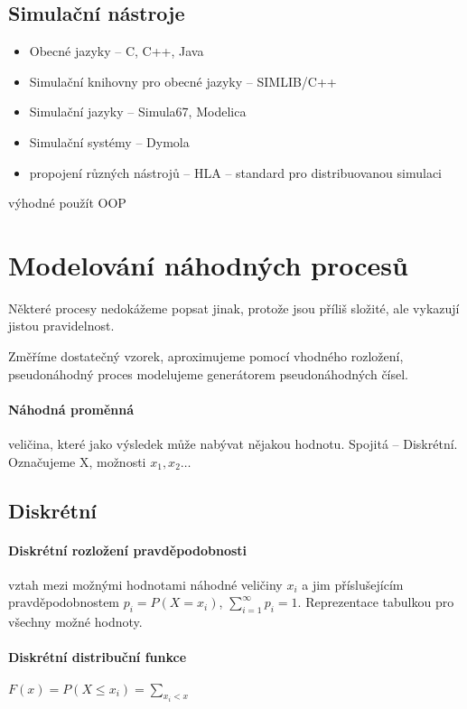 \documentclass[a4paper, 11pt]{report}
\begin{document}
\subsection{Simulační nástroje}
\begin{itemize}
	\item Obecné jazyky -- C, C++, Java
	\item Simulační knihovny pro obecné jazyky -- SIMLIB/C++
	\item Simulační jazyky -- Simula67, Modelica
	\item Simulační systémy -- Dymola
	\item propojení různých nástrojů -- HLA -- standard pro distribuovanou simulaci
\end{itemize}
výhodné použít OOP

\section{Modelování náhodných procesů}

Některé procesy nedokážeme popsat jinak, protože jsou příliš složité, ale vykazují jistou pravidelnost.

Změříme dostatečný vzorek, aproximujeme pomocí vhodného rozložení, pseudonáhodný proces modelujeme generátorem pseudonáhodných čísel.

\paragraph{Náhodná proměnná}
veličina, které jako výsledek může nabývat nějakou hodnotu. Spojitá -- Diskrétní. Označujeme X, možnosti $x_1, x_2 \dots$

\subsection{Diskrétní}

\paragraph{Diskrétní rozložení pravděpodobnosti}
vztah mezi možnými hodnotami náhodné veličiny $x_i$ a jim příslušejícím pravděpodobnostem $p_i = P(X = x_i)$, $\sum_{i = 1}^\infty p_i = 1$. Reprezentace tabulkou pro všechny možné hodnoty.

\paragraph{Diskrétní distribuční funkce}
$F(x) = P(X \leq x_i) = \sum_{x_i < x}$
\end{document}

